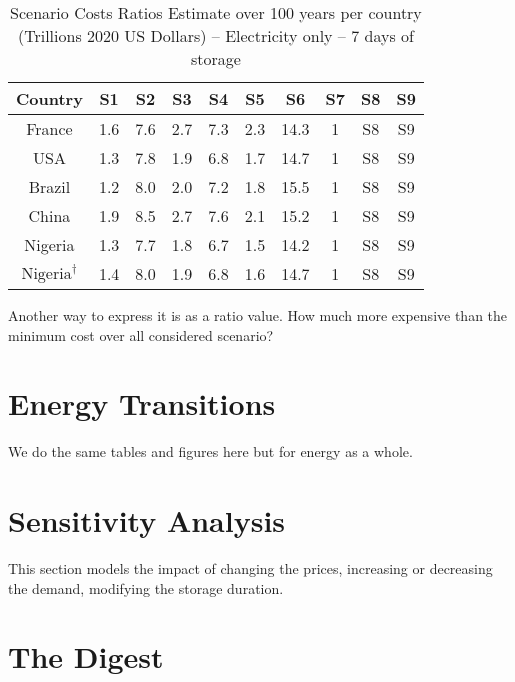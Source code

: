 \begin{table}[ht]
\caption[Scenario Costs Ratios Estimate over 100 years per country (Trillions US Dollars -- Electricity only -- 7 days of storage)]{Scenario Costs Ratios Estimate over 100 years per country (Trillions 2020 US Dollars) -- Electricity only -- 7 days of storage}
\begin{tabular}{ c c c c c c c c c c }
	\toprule
	Country & S1 & S2 & S3 & S4 & S5 & S6 & S7 & S8 & S9 \\
	\midrule
France & 1.6 & 7.6 & 2.7 & 7.3 & 2.3 & 14.3 & 1 & S8 & S9\\
USA & 1.3 & 7.8 & 1.9 & 6.8 & 1.7 & 14.7 & 1 & S8 & S9\\
Brazil & 1.2 & 8.0 & 2.0 & 7.2 & 1.8 & 15.5 & 1 & S8 & S9\\
China & 1.9 & 8.5 & 2.7 & 7.6 & 2.1 & 15.2 & 1 & S8 & S9\\
Nigeria & 1.3 & 7.7 & 1.8 & 6.7 & 1.5 & 14.2 & 1 & S8 & S9\\
$\mbox{Nigeria}^{\dagger}$ & 1.4 & 8.0 & 1.9 & 6.8 & 1.6 & 14.7 & 1 & S8 & S9\\
	\bottomrule
\end{tabular}
\end{table}







Another way to express it is as a ratio value. How much more expensive than the minimum cost over all considered scenario?

\blindtext


\section{Energy Transitions}

We do the same tables and figures here but for energy as a whole.


\blindtext


\section{Sensitivity Analysis}

This section models the impact of changing the prices, increasing or decreasing the demand, modifying the storage duration.

\blindtext

\section{The Digest}


